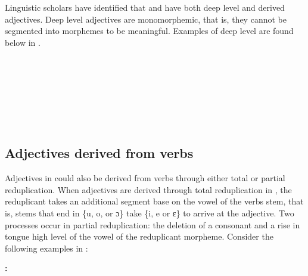 \documentclass[output=paper,
modfonts
]{langscibook}
\begin{document}
Linguistic scholars \citep{Dakubu1987,Adi2003,Adams1999,Adams2000,Odonkor2004,Amfo2007,Caesar2013} have identified that  and  have both deep level and derived adjectives. Deep level adjectives are monomorphemic, that is, they cannot be segmented into morphemes to be meaningful. Examples of deep level are found below in .


 
\ea\label{ex:caesar:1}  
\\
\\ 
\\ 
\\ 
\\ 
\\  
\z
\subsection{Adjectives derived from verbs}\label{sec:caesar:2.1} 

Adjectives in  could also be derived from verbs through either total or partial reduplication. When adjectives are derived through total reduplication in , the reduplicant takes an additional segment base on the vowel of the verbs stem, that is,  stems that end in \{u, o, or ɔ\} take \{i, e or ɛ\} to arrive at the adjective. Two processes occur in partial reduplication: the deletion of a consonant and a rise in tongue high level of the vowel of the reduplicant morpheme. Consider the following examples in :


\ea\label{ex:caesar:2}
\textbf{:} \\
\\ 
\\ 
\\ 
\\ 
\\ 
\\ 
\\ 
\\ 
\\ 
\\  
\z
\end{document}
